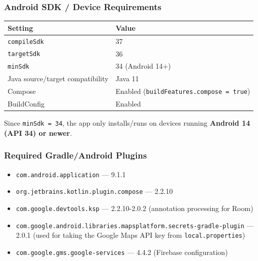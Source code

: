 \documentclass{article}
\begin{document}
                    \subsubsection*{Android SDK / Device Requirements}

                    \begin{center}
                        \begin{tabular}{p{5cm} p{7cm}}
                            \toprule
                            \textbf{Setting} & \textbf{Value} \\ \midrule
                            \texttt{compileSdk} & 37 \\ \addlinespace
                            \texttt{targetSdk} & 36 \\ \addlinespace
                            \texttt{minSdk} & 34 (Android 14+) \\ \addlinespace
                                Java source/target compatibility & Java 11 \\ \addlinespace
                                Compose & Enabled (\texttt{buildFeatures.compose = true}) \\ \addlinespace
                                BuildConfig & Enabled \\ \bottomrule
                        \end{tabular}
                    \end{center}

                    Since \texttt{minSdk = 34}, the app only installs/runs on devices running \textbf{Android 14 (API 34) or newer}.

                    \subsubsection*{Required Gradle/Android Plugins}

                        \begin{itemize}
                            \item \texttt{com.android.application} --- 9.1.1
                            \item \texttt{org.jetbrains.kotlin.plugin.compose} --- 2.2.10
                            \item \texttt{com.google.devtools.ksp} --- 2.2.10-2.0.2 (annotation processing for Room)
                            \item \texttt{com.google.android.libraries.mapsplatform.secrets-gradle-plugin} --- 2.0.1 (used for taking the Google Maps API key from \texttt{local.properties})
                            \item \texttt{com.google.gms.google-services} --- 4.4.2 (Firebase configuration)
                        \end{itemize}
\end{document}
